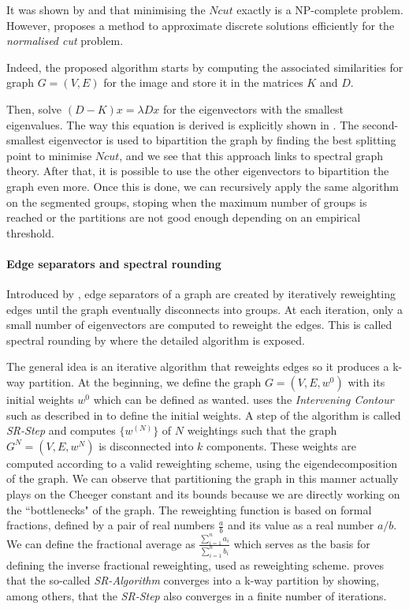 \documentclass[]{article}
\begin{document}
It was shown by \cite{papadimitriou_npcompleteness_1997} and \cite{shi_normalized_2000} that minimising the \(Ncut\) exactly is a NP-complete problem.
However, \cite{shi_normalized_2000} proposes a method to approximate discrete solutions efficiently for the \textit{normalised cut} problem.

Indeed, the proposed algorithm starts by computing the associated similarities for graph \(G = (V, E)\) for the image and store it in the matrices \(K\) and \(D\).

Then, solve \((D-K)x = \lambda Dx\) for the eigenvectors with the smallest eigenvalues.
The way this equation is derived is explicitly shown in \cite{shi_normalized_2000}.
The second-smallest eigenvector is used to bipartition the graph by finding the best splitting point to minimise \(Ncut\), and we see that this approach links to spectral graph theory.
After that, it is possible to use the other eigenvectors to bipartition the graph even more.
Once this is done, we can recursively apply the same algorithm on the segmented groups, stoping when the maximum number of groups is reached or the partitions are not good enough depending on an empirical threshold.

\paragraph{Edge separators and spectral rounding}
Introduced by \cite{tolliver_graph_2006}, edge separators of a graph are created by iteratively reweighting edges until the graph eventually disconnects into groups.
At each iteration, only a small number of eigenvectors are computed to reweight the edges.
This is called spectral rounding by \cite{tolliver_graph_2006} where the detailed algorithm is exposed.

The general idea is an iterative algorithm that reweights edges so it produces a k-way partition.
At the beginning, we define the graph \(G = (V, E, w^0)\) with its initial weights \(w^0\) which can be defined as wanted.
\cite{tolliver_graph_2006} uses the \textit{Intervening Contour} such as described in \cite{shi_normalized_2000} to define the initial weights.
A step of the algorithm is called \textit{SR-Step} and computes \(\{w^{(N)}\}\) of \(N\) weightings such that the graph \(G^N = (V, E, w^N)\) is disconnected into \(k\) components.
These weights are computed according to a valid reweighting scheme, using the eigendecomposition of the graph.
We can observe that partitioning the graph in this manner actually plays on the Cheeger constant and its bounds because we are directly working on the ``bottlenecks" of the graph.
The reweighting function is based on formal fractions, defined by a pair of real numbers \(\frac{a}{b}\) and its value as a real number \(a/b\).
We can define the fractional average as \(\frac{\sum_{i=1}^n a_i}{\sum_{i=1}^n b_i}\) which serves as the basis for defining the inverse fractional reweighting, used as reweighting scheme.
\cite{tolliver_graph_2006} proves that the so-called \textit{SR-Algorithm} converges into a k-way partition by showing, among others, that the \textit{SR-Step} also converges in a finite number of iterations.
\end{document}
